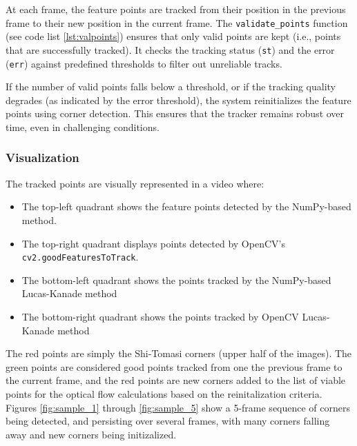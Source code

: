 \documentclass[11pt, conference, letterpaper]{IEEEtran}
\begin{document}
At each frame, the feature points are tracked from their position in the previous frame to their new position in the current frame. The \texttt{validate\_points} function (see code list \ref{lst:valpoints}) ensures that only valid points are kept (i.e., points that are successfully tracked). It checks the tracking status (\texttt{st}) and the error (\texttt{err}) against predefined thresholds to filter out unreliable tracks.

If the number of valid points falls below a threshold, or if the tracking quality degrades (as indicated by the error threshold), the system reinitializes the feature points using corner detection. This ensures that the tracker remains robust over time, even in challenging conditions.

\bigskip

\subsubsection{Visualization}
The tracked points are visually represented in a video where:
\begin{itemize}
    \item The top-left quadrant shows the feature points detected by the NumPy-based method.
    \item The top-right quadrant displays points detected by OpenCV's \texttt{cv2.goodFeaturesToTrack}.
    \item The bottom-left quadrant shows the points tracked by the NumPy-based Lucas-Kanade method
    \item The bottom-right quadrant shows the points tracked by OpenCV Lucas-Kanade method
\end{itemize}
The red points are simply the Shi-Tomasi corners (upper half of the images). The green points are considered good points tracked from one the previous frame to the current frame, and the red points are new corners added to the list of viable points for the optical flow calculations based on the reinitalization criteria. Figures \ref{fig:sample_1} through \ref{fig:sample_5} show a 5-frame sequence of corners being detected, and persisting over several frames, with many corners falling away and new corners being initizalized.
\bigskip
\end{document}
